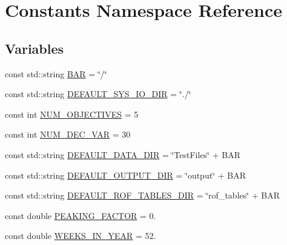 \hypertarget{namespaceConstants}{}\section{Constants Namespace Reference}
\label{namespaceConstants}
\subsection*{Variables}
\begin{DoxyCompactItemize}
\item 
const std\+::string \mbox{\hyperlink{namespaceConstants_aaec5cbce5156ab790b3ae0563692fd92_aaec5cbce5156ab790b3ae0563692fd92}{B\+AR}} = \char`\"{}/\char`\"{}
\item 
const std\+::string \mbox{\hyperlink{namespaceConstants_aba68b8131899cf13623e86c9d409ba91_aba68b8131899cf13623e86c9d409ba91}{D\+E\+F\+A\+U\+L\+T\+\_\+\+S\+Y\+S\+\_\+\+I\+O\+\_\+\+D\+IR}} = \char`\"{}./\char`\"{}
\item 
const int \mbox{\hyperlink{namespaceConstants_a1e8f5e39c26fb06762a071611c7e432f_a1e8f5e39c26fb06762a071611c7e432f}{N\+U\+M\+\_\+\+O\+B\+J\+E\+C\+T\+I\+V\+ES}} = 5
\item 
const int \mbox{\hyperlink{namespaceConstants_aa7919506e218b884dc934282a86594c1_aa7919506e218b884dc934282a86594c1}{N\+U\+M\+\_\+\+D\+E\+C\+\_\+\+V\+AR}} = 30
\item 
const std\+::string \mbox{\hyperlink{namespaceConstants_a236b0a1c5920895bf4bdf11191bf414d_a236b0a1c5920895bf4bdf11191bf414d}{D\+E\+F\+A\+U\+L\+T\+\_\+\+D\+A\+T\+A\+\_\+\+D\+IR}} = \char`\"{}Test\+Files\char`\"{} + B\+AR
\item 
const std\+::string \mbox{\hyperlink{namespaceConstants_ad340f8cb6d76396687295b5fc306e058_ad340f8cb6d76396687295b5fc306e058}{D\+E\+F\+A\+U\+L\+T\+\_\+\+O\+U\+T\+P\+U\+T\+\_\+\+D\+IR}} = \char`\"{}output\char`\"{} + B\+AR
\item 
const std\+::string \mbox{\hyperlink{namespaceConstants_a377a23d7faa55e3e687bd0b844c3d3e1_a377a23d7faa55e3e687bd0b844c3d3e1}{D\+E\+F\+A\+U\+L\+T\+\_\+\+R\+O\+F\+\_\+\+T\+A\+B\+L\+E\+S\+\_\+\+D\+IR}} = \char`\"{}rof\+\_\+tables\char`\"{} + B\+AR
\item 
const double \mbox{\hyperlink{namespaceConstants_abbfa799f216f5cc36a12c64b83140213_abbfa799f216f5cc36a12c64b83140213}{P\+E\+A\+K\+I\+N\+G\+\_\+\+F\+A\+C\+T\+OR}} = 0.
\item 
const double \mbox{\hyperlink{namespaceConstants_a19e84af3cbc6e1318beb22408c2a1f2f_a19e84af3cbc6e1318beb22408c2a1f2f}{W\+E\+E\+K\+S\+\_\+\+I\+N\+\_\+\+Y\+E\+AR}} = 52.

\end{DoxyCompactItemize}
